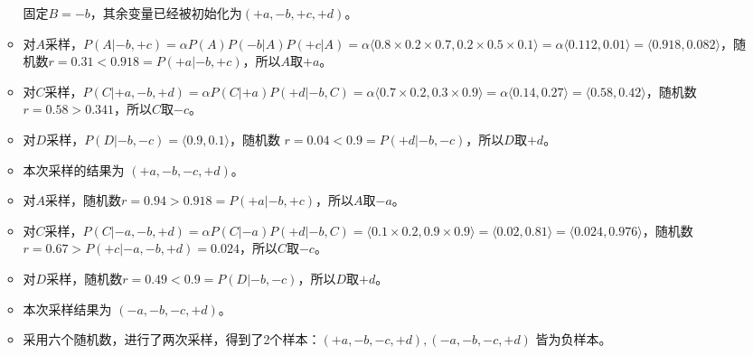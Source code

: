 \begin{enumerate}
\begin{solution}
        \begin{itemize}
            固定$B=-b$，其余变量已经被初始化为$(+a,-b,+c,+d)$。
            \item 对$A$采样，$P(A| -b,+c)=\alpha P(A)P(-b|A)P(+c|A)=\alpha\langle 0.8\times 0.2\times 0.7, 0.2\times 0.5\times 0.1 \rangle=\alpha\langle 0.112, 0.01\rangle=\langle 0.918,0.082\rangle$，随机数$r=0.31<0.918=P(+a|-b,+c)$，所以$A$取$+a$。
            \item 对$C$采样，$P(C| +a,-b,+d)=\alpha P(C|+a)P(+d|-b,C)=\alpha\langle 0.7\times 0.2, 0.3\times 0.9 \rangle=\alpha\langle 0.14,0.27 \rangle=\langle 0.58,0.42\rangle$，随机数$r=0.58>0.341$，所以$C$取$-c$。
            \item 对$D$采样，$P(D| -b,-c)=\langle 0.9,0.1 \rangle$，随机数 $r=0.04<0.9=P(+d|-b,-c)$，所以$D$取$+d$。
            \item 本次采样的结果为 $(+a,-b,-c,+d)$。
            \item 对$A$采样，随机数$r=0.94>0.918=P(+a|-b,+c)$，所以$A$取$-a$。
            \item 对$C$采样，$P(C| -a,-b,+d)=\alpha P(C|-a)P(+d|-b,C)=\langle 0.1\times 0.2, 0.9\times 0.9\rangle=\langle 0.02,0.81 \rangle=\langle 0.024,0.976 \rangle$，随机数$r=0.67>P(+c|-a,-b,+d)=0.024$，所以$C$取$-c$。
            \item 对$D$采样，随机数$r=0.49<0.9=P(D|-b,-c)$，所以$D$取$+d$。
            \item 本次采样结果为 $(-a,-b,-c,+d)$。
            \item 采用六个随机数，进行了两次采样，得到了2个样本：$(+a,-b,-c,+d), (-a, -b, -c, +d)$ 皆为负样本。
        \end{itemize}
    \end{solution}
\end{enumerate}

